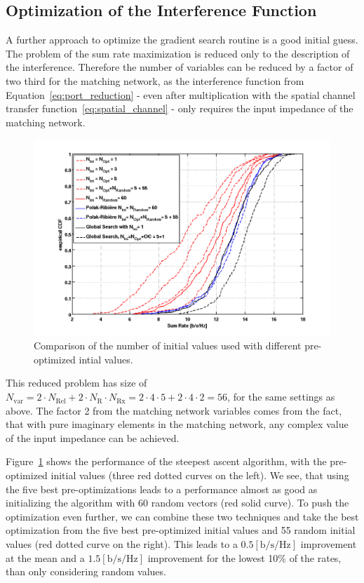 \subsection{Optimization of the Interference Function}
\label{sec:preoptimization}
A further approach to optimize the gradient search routine is a good initial guess.
The problem of the sum rate maximization is reduced only to the description of the interference.
Therefore the number of variables can be reduced by a factor of two third for the matching network, as the interference function from Equation~\eqref{eq:port_reduction} - even after multiplication with the spatial channel transfer function~\eqref{eq:spatial_channel} - only requires the input impedance of the matching network.
\begin{figure}[h]
\centering
  \includegraphics[width=0.9\linewidth]{images/Inioptcomparison_edited.png}
\caption{Comparison of the number of initial values used with different pre-optimized intial values.}
\label{fig:iniopt_comp}
\end{figure}
This reduced problem has size of $N_\text{var} =  2\cdot N_\text{Rel}+2\cdot N_\text{R}\cdot N_\text{Rx} = 2\cdot 4\cdot 5 + 2\cdot 4\cdot 2 = 56$, for the same settings as above.
The factor 2 from the matching network variables comes from the fact, that with pure imaginary elements in the matching network, any complex value of the input impedance can be achieved.


Figure~\ref{fig:iniopt_comp} shows the performance of the steepest ascent algorithm, with the pre-optimized initial values (three red dotted curves on the left).
We see, that using the five best pre-optimizations leads to a performance almost as good as initializing the algorithm with 60 random vectors (red solid curve).
To push the optimization even further, we can combine these two techniques and take the best optimization from the five best pre-optimized initial values and 55 random initial values (red dotted curve on the right).
This leads to a $0.5 \left[\text{b/s/Hz}\right]$ improvement at the mean and a $1.5 \left[\text{b/s/Hz}\right]$ improvement for the lowest 10\% of the rates, than only considering random values.

